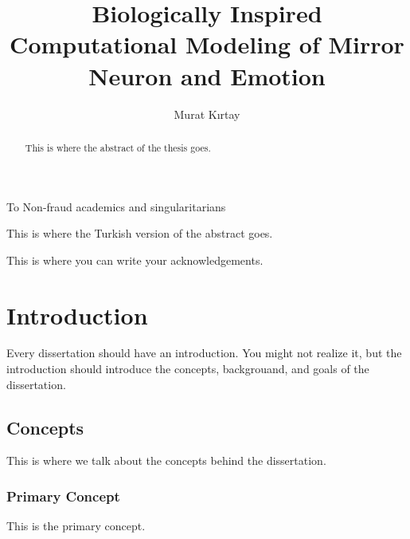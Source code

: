 \documentclass[a4,12pt]{ozu-thesis}
\title{Biologically Inspired Computational Modeling of Mirror Neuron and Emotion} %
\author{Murat K{\i}rtay}
\begin{document}


\begin{preliminary}

\begin{dedication}
\null\vfil
{\large
\begin{center}
To Non-fraud academics and singularitarians
\end{center}}
\vfil\null
\end{dedication}

\begin{abstract}
This is where the abstract of the thesis goes.
\end{abstract}

\begin{ozetce}
This is where the Turkish version of the abstract goes.
\end{ozetce}

\begin{acknowledgements}
This is where you can write your acknowledgements.
\end{acknowledgements}


\contents
%

\end{preliminary}

\chapter{Introduction}

Every dissertation should have an introduction.  You might not realize
it, but the introduction should introduce the concepts, backgrouand,
and goals of the dissertation.

\section{Concepts}

This is where we talk about the concepts behind the dissertation.

\subsection{Primary Concept}

This is the primary concept.
\end{document}
